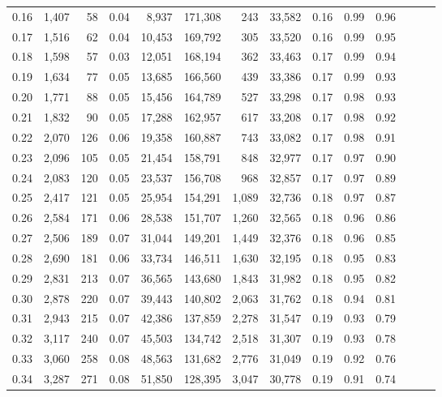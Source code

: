 \begin{tabular}{rrrrrrrrrrrrrr}
0.16 &  1,407 &   58 &  0.04 &    8,937 &  171,308 &     243 &  33,582 &  0.16 &  0.99 &      0.96 \\
0.17 &  1,516 &   62 &  0.04 &   10,453 &  169,792 &     305 &  33,520 &  0.16 &  0.99 &      0.95 \\
0.18 &  1,598 &   57 &  0.03 &   12,051 &  168,194 &     362 &  33,463 &  0.17 &  0.99 &      0.94 \\
0.19 &  1,634 &   77 &  0.05 &   13,685 &  166,560 &     439 &  33,386 &  0.17 &  0.99 &      0.93 \\
0.20 &  1,771 &   88 &  0.05 &   15,456 &  164,789 &     527 &  33,298 &  0.17 &  0.98 &      0.93 \\
0.21 &  1,832 &   90 &  0.05 &   17,288 &  162,957 &     617 &  33,208 &  0.17 &  0.98 &      0.92 \\
0.22 &  2,070 &  126 &  0.06 &   19,358 &  160,887 &     743 &  33,082 &  0.17 &  0.98 &      0.91 \\
0.23 &  2,096 &  105 &  0.05 &   21,454 &  158,791 &     848 &  32,977 &  0.17 &  0.97 &      0.90 \\
0.24 &  2,083 &  120 &  0.05 &   23,537 &  156,708 &     968 &  32,857 &  0.17 &  0.97 &      0.89 \\
0.25 &  2,417 &  121 &  0.05 &   25,954 &  154,291 &   1,089 &  32,736 &  0.18 &  0.97 &      0.87 \\
0.26 &  2,584 &  171 &  0.06 &   28,538 &  151,707 &   1,260 &  32,565 &  0.18 &  0.96 &      0.86 \\
0.27 &  2,506 &  189 &  0.07 &   31,044 &  149,201 &   1,449 &  32,376 &  0.18 &  0.96 &      0.85 \\
0.28 &  2,690 &  181 &  0.06 &   33,734 &  146,511 &   1,630 &  32,195 &  0.18 &  0.95 &      0.83 \\
0.29 &  2,831 &  213 &  0.07 &   36,565 &  143,680 &   1,843 &  31,982 &  0.18 &  0.95 &      0.82 \\
0.30 &  2,878 &  220 &  0.07 &   39,443 &  140,802 &   2,063 &  31,762 &  0.18 &  0.94 &      0.81 \\
0.31 &  2,943 &  215 &  0.07 &   42,386 &  137,859 &   2,278 &  31,547 &  0.19 &  0.93 &      0.79 \\
0.32 &  3,117 &  240 &  0.07 &   45,503 &  134,742 &   2,518 &  31,307 &  0.19 &  0.93 &      0.78 \\
0.33 &  3,060 &  258 &  0.08 &   48,563 &  131,682 &   2,776 &  31,049 &  0.19 &  0.92 &      0.76 \\
0.34 &  3,287 &  271 &  0.08 &   51,850 &  128,395 &   3,047 &  30,778 &  0.19 &  0.91 &      0.74 \\

\end{tabular}
